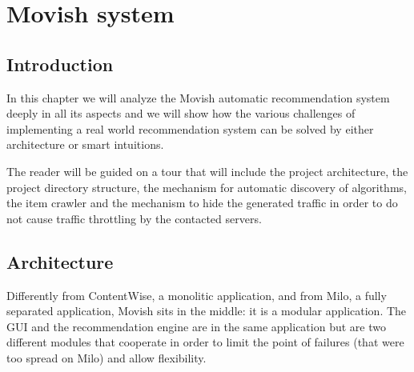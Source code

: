 \chapter{Movish system}
\label{chapter:movish_system}

\section{Introduction}
\label{sec:movish_system_introduction}

In this chapter we will analyze the Movish automatic recommendation system deeply in all its aspects and we will show how the various challenges of implementing a real world recommendation system can be solved by either architecture or smart intuitions.

The reader will be guided on a tour that will include the project architecture, the project directory structure, the mechanism for automatic discovery of algorithms, the item crawler and the mechanism to hide the generated traffic in order to do not cause traffic throttling by the contacted servers.

\section{Architecture}
\label{sec:architecture}

Differently from ContentWise, a monolitic application, and from Milo, a fully separated application, Movish sits in the middle: it is a modular application. The \ac{GUI} and the recommendation engine are in the same application but are two different modules that cooperate in order to limit the point of failures (that were too spread on Milo) and allow flexibility.

